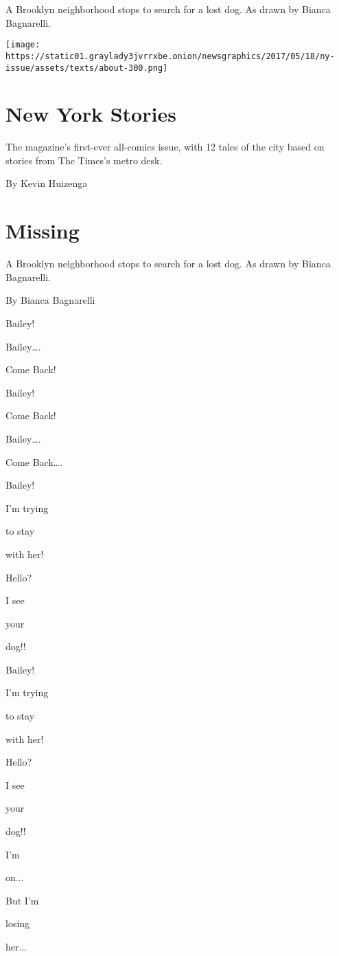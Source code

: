A Brooklyn neighborhood stops to search for a lost dog. As drawn by
Bianca Bagnarelli.

\texttt{[image: https://static01.graylady3jvrrxbe.onion/newsgraphics/2017/05/18/ny-issue/assets/texts/about-300.png]}

\hypertarget{new-york-stories}{%
\section{New York Stories}\label{new-york-stories}}

The magazine's first-ever all-comics issue, with 12 tales of the city
based on stories from The Times's metro desk.

By Kevin Huizenga

\hypertarget{missing-1}{%
\section{Missing}\label{missing-1}}

A Brooklyn neighborhood stops to search for a lost dog. As drawn by
Bianca Bagnarelli.

By Bianca Bagnarelli

Bailey!

Bailey\ldots{}.

Come Back!

Bailey!

Come Back!

Bailey\ldots{}.

Come Back\ldots{}.

Bailey!

I'm trying

to stay

with her!

Hello?

I see

your

dog!!

Bailey!

I'm trying

to stay

with her!

Hello?

I see

your

dog!!

I'm

on...

But I'm

losing

her...

